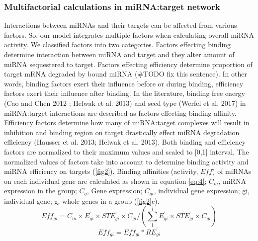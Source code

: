 \documentclass[]{article}
\begin{document}
\hypertarget{multifactorial-calculations-in-mirnatarget-network}{%
\subsubsection{Multifactorial calculations in miRNA:target
network}\label{multifactorial-calculations-in-mirnatarget-network}}

Interactions between miRNAs and their targets can be affected from
various factors. So, our model integrates multiple factors when
calculating overall miRNA activity. We classified factors into two
categories. Factors effecting binding determine interaction between
miRNA and target and they alter amount of miRNA sequestered to target.
Factors effecting efficiency determine proportion of target mRNA
degraded by bound miRNA (\#TODO fix this sentence). In other words,
binding factors exert their influence before or during binding,
efficiency factors exert their influence after binding. In the
literature, binding free energy (Cao and Chen 2012 ; Helwak et al. 2013)
and seed type (Werfel et al. 2017) in miRNA:target interactions are
described as factors effecting binding affinity. Efficiency factors
determine how many of miRNA:target complexes will result in inhibition
and binding region on target drastically effect miRNA degradation
efficiency (Hausser et al. 2013; Helwak et al. 2013). Both binding and
efficiency factors are normalized to their maximum values and scaled to
{[}0,1{]} interval. The normalized values of factors take into account
to determine binding activity and miRNA efficiency on targets
(\autoref{fig2}). Binding affinities (activity, \(Eff\)) of miRNAs on
each individual gene are calculated as shown in equation \eqref{eq:4};
\(C_m\), miRNA expression in the group; \(C_g\), Gene expression;
\(C_{gi}\), individual gene expression; gi, individual gene; g, whole
genes in a group (\autoref{fig2}c). \begin{equation}
Eff_{gi}= C_m \times E^\prime_{gi} \times STE^\prime_{gi} \times C_{gi}/(\sum_{1}^{i} E^\prime_{gi} \times STE^\prime_{gi} \times C_{gi}) \tag{4}\label{eq:4}
\end{equation} \begin{equation}
Eff_{gi}= Eff_{gi}*RE^\prime_{gi} \tag{5}\label{eq:5}
\end{equation}
\end{document}
